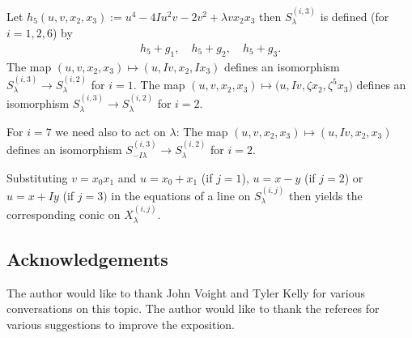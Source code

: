 \documentclass[pdftex]{sigma}
\numberwithin{equation}{section}
\begin{document}
Let $h_5(u,v,x_2,x_3):=u^4-4 I u^2v-2v^2+\lambda vx_2x_3$ then $S^{(i,3)}_{\lambda}$ is def\/ined (for $i=1,2,6$) by
\begin{gather*} h_5+g_1,\quad h_5+g_2,\quad h_5+g_3.\end{gather*}
The map $(u,v,x_2,x_3)\mapsto (u,Iv,x_2,Ix_3)$ def\/ines an isomorphism $S^{(i,3)}_{\lambda} \to S^{(i,2)}_{\lambda}$ for $i=1$. The map $(u,v,x_2,x_3)\mapsto \big(u,Iv,\zeta x_2,\zeta^5 x_3\big)$ def\/ines an isomorphism $S^{(i,3)}_{\lambda} \to S^{(i,2)}_{\lambda}$ for $i=2$.

For $i=7$ we need also to act on $\lambda$: The map $(u,v,x_2,x_3)\mapsto (u,Iv, x_2, x_3)$ def\/ines an isomorphism $S^{(i,3)}_{-I\lambda} \to S^{(i,2)}_{\lambda}$ for $i=2$.

Substituting $v=x_0x_1$ and $u=x_0+x_1$ (if $j=1$), $u=x-y$ (if $j=2$) or $u=x+Iy$ (if $j=3)$ in the equations of a line on $S^{(i,j)}_{\lambda}$ then yields the corresponding conic on $X_\lambda^{(i,j)}$.

\subsection*{Acknowledgements}

The author would like to thank John Voight and Tyler Kelly for various conversations on this topic. The author would like to thank the referees for various suggestions to improve the exposition.
\end{document}
